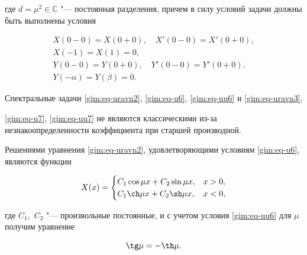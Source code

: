 где $d=\mu^2\in \mathbb{C}$ "--- постоянная разделения, причем в силу условий задачи должны быть выполнены условия

\begin{gather}

X(0-0)=X(0+0),\quad X'(0-0)=X'(0+0),\label{gim:eq-u6}

\\

X(-1)=X(1)=0,\label{gim:eq-uu6}

\\

Y(0-0)=Y(0+0),\quad Y'(0-0)=Y'(0+0),\label{gim:eq-u7}

\\

Y(-\alpha)=Y(\beta)=0.\label{gim:eq-uu7}

\end{gather}



Спектральные задачи \eqref{gim:eq-uravn2}, \eqref{gim:eq-u6}, \eqref{gim:eq-uu6} и  \eqref{gim:eq-uravn3}, 

\eqref{gim:eq-u7}, \eqref{gim:eq-uu7} не являются классическими из-за незнакоопределенности коэффициента при старшей производной. %



Решениями уравнения \eqref{gim:eq-uravn2}, удовлетворяющими  условиям \eqref{gim:eq-u6}, являются функции

$$

X(x)=\begin{cases}

C_1\cos \mu x+C_2\sin \mu x, & x>0,\\ 

C_1\ch \mu x+C_2\sh \mu x, & x<0,

\end{cases}$$

где $C_1,$ $C_2$ "--- произвольные постоянные, и с учетом условия \eqref{gim:eq-uu6} для $\mu$ получим уравнение

\begin{equation}

\tg \mu=-\th \mu.

\label{gim:eq-uravnmu1}

\end{equation}



\smallskip



